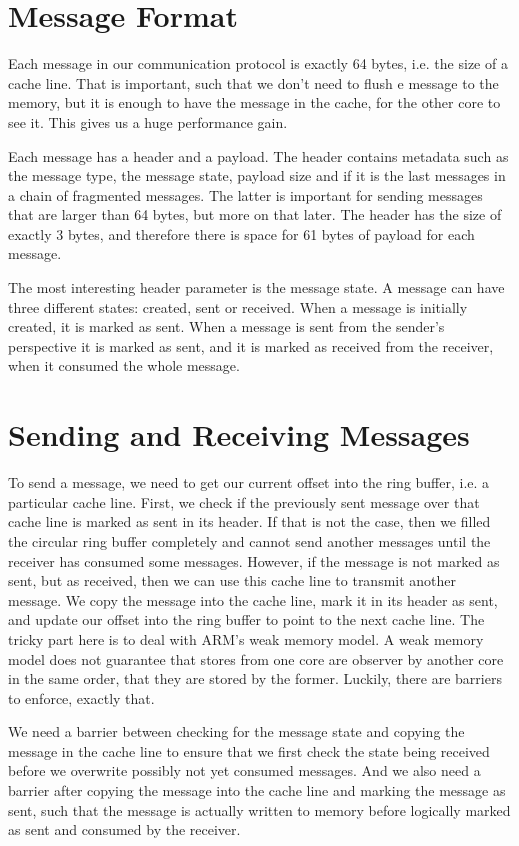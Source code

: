 \section{Message Format}

Each message in our communication protocol is exactly 64 bytes, i.e. the size of
a cache line. That is important, such that we don't need to flush e message to
the memory, but it is enough to have the message in the cache, for the other
core to see it. This gives us a huge performance gain.

Each message has a header and a payload. The header contains metadata such as
the message type, the message state, payload size and if it is the last messages
in a chain of fragmented messages. The latter is important for sending messages
that are larger than 64 bytes, but more on that later. The header has the size
of exactly 3 bytes, and therefore there is space for 61 bytes of payload for
each message.

The most interesting header parameter is the message state. A message can have
three different states: created, sent or received. When a message is initially
created, it is marked as sent. When a message is sent from the sender's
perspective it is marked as sent, and it is marked as received from the
receiver, when it consumed the whole message.

\section{Sending and Receiving Messages}

To send a message, we need to get our current offset into the ring buffer, i.e.
a particular cache line. First, we check if the previously sent message over
that cache line is marked as sent in its header. If that is not the case, then
we filled the circular ring buffer completely and cannot send another messages
until the receiver has consumed some messages. However, if the message is not
marked as sent, but as received, then we can use this cache line to transmit
another message. We copy the message into the cache line, mark it in its header
as sent, and update our offset into the ring buffer to point to the next cache
line. The tricky part here is to deal with ARM's weak memory model. A weak
memory model does not guarantee that stores from one core are observer by
another core in the same order, that they are stored by the former. Luckily,
there are barriers to enforce, exactly that.

We need a barrier between checking for the message state and copying the message
in the cache line to ensure that we first check the state being received before
we overwrite possibly not yet consumed messages. And we also need a barrier
after copying the message into the cache line and marking the message as sent,
such that the message is actually written to memory before logically marked as
sent and consumed by the receiver.


